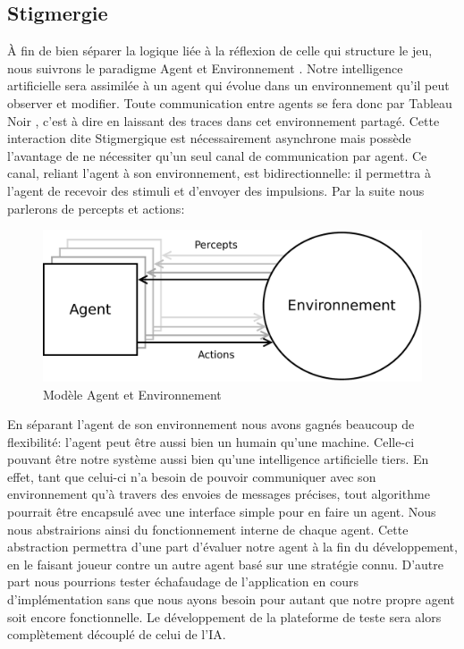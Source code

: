 \subsection{ \og Stigmergie \fg{} }

À fin de bien séparer la logique liée à la réflexion de celle qui structure le jeu, nous suivrons le paradigme \og Agent et Environnement \fg{}. Notre intelligence artificielle sera assimilée à un agent qui évolue dans un environnement qu'il peut observer et modifier. 
Toute communication entre agents se fera donc par \og Tableau Noir \fg{}, c'est à dire en laissant des traces dans cet environnement partagé. Cette interaction dite \og Stigmergique \fg{} est nécessairement asynchrone mais possède l'avantage de ne nécessiter qu'un seul canal de communication par agent.
Ce canal, reliant l'agent à son environnement, est bidirectionnelle: il permettra à l'agent de recevoir des stimuli et d'envoyer des impulsions. Par la suite nous parlerons de \og percepts\fg{} et \og actions\fg{}:

\begin{figure}[H] 
\centering
\includegraphics[width=\textwidth]{files/env/agent_env} 
\caption{Modèle \og Agent et Environnement \fg{}} 
\label{agent_env}
\end{figure}

En séparant l'agent de son environnement nous avons gagnés beaucoup de flexibilité: l'agent peut être aussi bien un humain qu'une machine. Celle-ci pouvant être notre système aussi bien qu'une intelligence artificielle tiers. 
En effet, tant que celui-ci n'a besoin de pouvoir communiquer avec son environnement qu'à travers des envoies de messages précises, tout algorithme pourrait être encapsulé avec une interface simple pour en faire un agent. Nous nous abstrairions ainsi du fonctionnement interne de chaque agent.
Cette abstraction permettra d'une part d'évaluer notre agent à la fin du développement, en le faisant joueur contre un autre agent basé sur une stratégie connu. D'autre part nous pourrions tester échafaudage de l'application en cours d'implémentation sans que nous ayons besoin pour autant que notre propre agent soit encore fonctionnelle. Le développement de la plateforme de teste sera alors complètement découplé de celui de l'IA.

